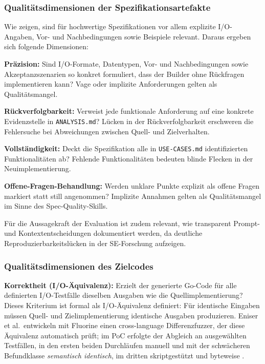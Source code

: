 \subsubsection{Qualitätsdimensionen der Spezifikationsartefakte}

Wie \textcite{midolo2026promptguidelines} zeigen, sind für hochwertige Spezifikationen vor allem explizite I/O-Angaben, Vor- und Nachbedingungen sowie Beispiele relevant. Daraus ergeben sich folgende Dimensionen:

\textbf{Präzision:} Sind I/O-Formate, Datentypen, Vor- und Nachbedingungen sowie Akzeptanzszenarien so konkret formuliert, dass der Builder ohne Rückfragen implementieren kann? Vage oder implizite Anforderungen gelten als Qualitätsmangel.

\textbf{Rückverfolgbarkeit:} Verweist jede funktionale Anforderung auf eine konkrete Evidenzstelle in \texttt{ANALYSIS.md}? Lücken in der Rückverfolgbarkeit erschweren die Fehlersuche bei Abweichungen zwischen Quell- und Zielverhalten.

\textbf{Vollständigkeit:} Deckt die Spezifikation alle in \texttt{USE-CASES.md} identifizierten Funktionalitäten ab? Fehlende Funktionalitäten bedeuten blinde Flecken in der Neuimplementierung.

\textbf{Offene-Fragen-Behandlung:} Werden unklare Punkte explizit als offene Fragen markiert statt still angenommen? Implizite Annahmen gelten als Qualitätsmangel im Sinne des Spec-Quality-Skills.

Für die Aussagekraft der Evaluation ist zudem relevant, wie transparent Prompt- und Kontextentscheidungen dokumentiert werden, da \textcite{korn2026reportingprompting} deutliche Reproduzierbarkeitslücken in der SE-Forschung aufzeigen.

\subsubsection{Qualitätsdimensionen des Zielcodes} \label{sec:qualitaet-code}

\textbf{Korrektheit (I/O-Äquivalenz):} Erzielt der generierte Go-Code für alle definierten I/O-Testfälle dieselben Ausgaben wie die Quellimplementierung? Dieses Kriterium ist formal als I/O-Äquivalenz definiert: Für identische Eingaben müssen Quell- und Zielimplementierung identische Ausgaben produzieren. Eniser et al.\ entwickeln mit Fluorine einen cross-language Differenzfuzzer, der diese Äquivalenz automatisch prüft; im PoC erfolgte der Abgleich an ausgewählten Testfällen, in den ersten beiden Durchläufen manuell und mit der schwächeren Befundklasse \emph{semantisch identisch}, im dritten skriptgestützt und byteweise \parencite{eniser2025realworld}.

